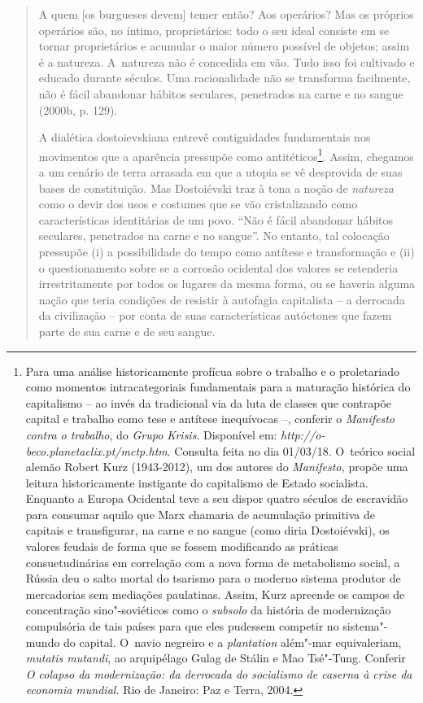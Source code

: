 {\begin{quote}
A quem {[}os burgueses devem{]} temer então? Aos operários? Mas os
próprios operários são, no íntimo, proprietários: todo o seu ideal
consiste em se tornar proprietários e acumular o maior número possível
de objetos; assim é a natureza. A~natureza não é concedida em vão. Tudo
isso foi cultivado e educado durante séculos. Uma racionalidade não se
transforma facilmente, não é fácil abandonar hábitos seculares,
penetrados na carne e no sangue (2000b, p. 129).

A dialética dostoievskiana entrevê contiguidades fundamentais nos
movimentos que a aparência pressupõe como antitéticos\footnote{Para uma
  análise historicamente profícua sobre o trabalho e o proletariado como
  momentos intracategoriais fundamentais para a maturação histórica do
  capitalismo -- ao invés da tradicional via da luta de classes que
  contrapõe capital e trabalho como tese e antítese inequívocas --,
  conferir o \emph{Manifesto contra o trabalho}, do \emph{Grupo Krisis}.
  Disponível em:
  \emph{http://o-beco.planetaclix.pt/mctp.htm}.
  Consulta feita no dia 01/03/18. O~teórico social alemão Robert Kurz
  (1943-2012), um dos autores do \emph{Manifesto,} propõe uma leitura
  historicamente instigante do capitalismo de Estado socialista.
  Enquanto a Europa Ocidental teve a seu dispor quatro séculos de
  escravidão para consumar aquilo que Marx chamaria de acumulação
  primitiva de capitais e transfigurar, na carne e no sangue (como diria
  Dostoiévski), os valores feudais de forma que se fossem modificando as
  práticas consuetudinárias em correlação com a nova forma de
  metabolismo social, a Rússia deu o salto mortal do tsarismo para o
  moderno sistema produtor de mercadorias sem mediações paulatinas.
  Assim, Kurz apreende os campos de concentração sino"-soviéticos como o
  \emph{subsolo} da história de modernização compulsória de tais países
  para que eles pudessem competir no sistema"-mundo do capital. O~navio
  negreiro e a \emph{plantation} além"-mar equivaleriam, \emph{mutatis
  mutandi}, ao arquipélago Gulag de Stálin e Mao Tsé"-Tung. Conferir
  \emph{O colapso da modernização: da derrocada do socialismo de caserna
  à crise da economia mundial.} Rio de Janeiro: Paz e Terra, 2004.}.
Assim, chegamos a um cenário de terra arrasada em que a utopia se vê
desprovida de suas bases de constituição. Mas Dostoiévski traz à tona a
noção de \emph{natureza} como o devir dos usos e costumes que se vão
cristalizando como características identitárias de um povo. ``Não é
fácil abandonar hábitos seculares, penetrados na carne e no sangue''. No
entanto, tal colocação pressupõe (i) a possibilidade do tempo como
antítese e transformação e (ii) o questionamento sobre se a corrosão
ocidental dos valores se estenderia irrestritamente por todos os lugares
da mesma forma, ou se haveria alguma nação que teria condições de
resistir à autofagia capitalista -- a derrocada da civilização -- por
conta de suas características autóctones que fazem parte de sua carne e
de seu sangue.


\end{quote}}
